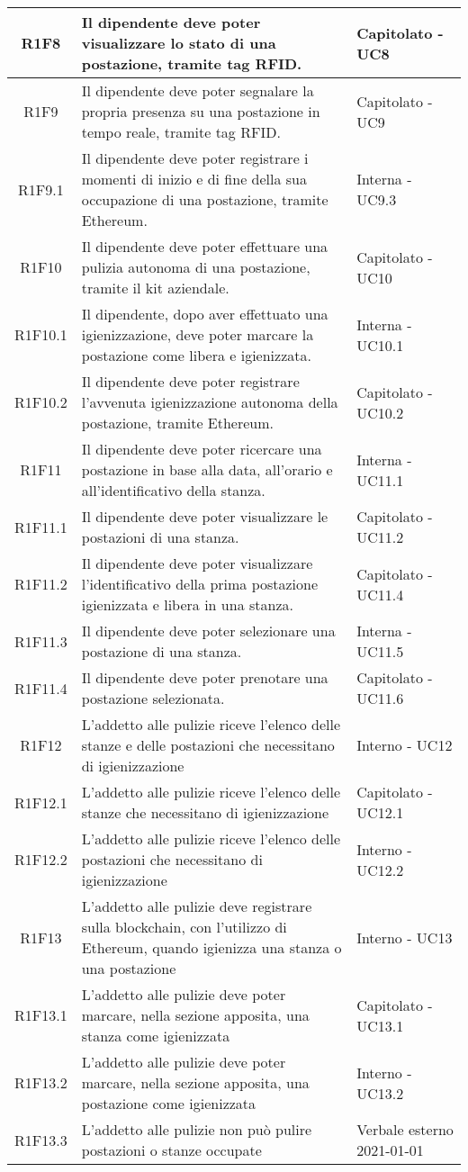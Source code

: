 \begin{center}
\begin{longtable}{|c|p{10cm}|p{4cm}|}
\hline
					R1F8&Il dipendente deve poter visualizzare lo stato di una postazione, tramite tag RFID.	&Capitolato - UC8 	\\
					\hline
			R1F9&Il dipendente deve poter segnalare la propria presenza su una postazione in tempo reale, tramite tag RFID.	&Capitolato - UC9 	\\
		\hline
		R1F9.1&Il dipendente deve poter registrare i momenti di inizio e di fine della sua occupazione di una postazione, tramite Ethereum.	&Interna - UC9.3 	\\
		\hline	
		R1F10&Il dipendente deve poter effettuare una pulizia autonoma di una postazione, tramite il kit aziendale.	&Capitolato - UC10	\\
		\hline		
		R1F10.1&Il dipendente, dopo aver effettuato una igienizzazione, deve poter marcare la postazione come libera e igienizzata.	&Interna - UC10.1	\\
		\hline	
		R1F10.2&Il dipendente deve poter registrare l'avvenuta igienizzazione autonoma della postazione, tramite Ethereum.	&Capitolato - UC10.2	\\
		\hline	
		R1F11&Il dipendente deve poter ricercare una postazione in base alla data, all'orario e all'identificativo della stanza.	&Interna - UC11.1	\\
		\hline
		R1F11.1&Il dipendente deve poter visualizzare le postazioni di una stanza.	&Capitolato - UC11.2	\\
		\hline
		R1F11.2&Il dipendente deve poter visualizzare l'identificativo della prima postazione igienizzata e libera in una stanza.	&Capitolato - UC11.4	\\
		\hline
		R1F11.3&Il dipendente deve poter selezionare una postazione di una stanza.	&Interna - UC11.5	\\
		\hline
		R1F11.4&Il dipendente deve poter prenotare una postazione selezionata.	&Capitolato - UC11.6	\\
		\hline
R1F12&L'addetto alle pulizie riceve l'elenco delle stanze e delle postazioni che necessitano di igienizzazione	& Interno - UC12	\\
						\hline
			R1F12.1&	L'addetto alle pulizie riceve l'elenco delle stanze che necessitano di igienizzazione& 	Capitolato - UC12.1\\
					\hline
			R1F12.2&L'addetto alle pulizie riceve l'elenco delle postazioni che necessitano di igienizzazione	& Interno - UC12.2	\\
					\hline
R1F13&L'addetto alle pulizie deve registrare sulla blockchain, con l'utilizzo di Ethereum, quando igienizza una stanza o una postazione	& Interno - UC13	\\
					\hline
R1F13.1&L'addetto alle pulizie deve poter marcare, nella sezione apposita, una stanza come igienizzata	& Capitolato - UC13.1	\\
						\hline
			R1F13.2&L'addetto alle pulizie deve poter marcare, nella sezione apposita, una postazione come igienizzata	&Interno - UC13.2 	\\
					\hline
			R1F13.3&L'addetto alle pulizie non può pulire postazioni o stanze occupate	& Verbale esterno 2021-01-01	\\
					\hline
						

\end{longtable}
\end{center}
